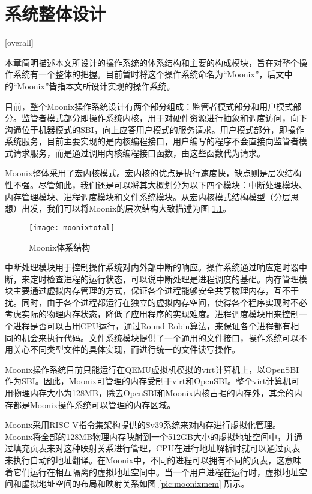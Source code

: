 
\chapter{系统整体设计}[overall]
\label{chapter:overall}

本章简明描述本文所设计的操作系统的体系结构和主要的构成模块，旨在对整个操作系统有一个整体的把握。目前暂时将这个操作系统命名为“Moonix”，后文中的“Moonix”皆指本文所设计实现的操作系统。

目前，整个Moonix操作系统设计有两个部分组成：监管者模式部分和用户模式部分。监管者模式部分即操作系统内核，用于对硬件资源进行抽象和调度访问，向下沟通位于机器模式的SBI，向上应答用户模式的服务请求。用户模式部分，即操作系统服务，目前主要实现的是内核编程接口，用户编写的程序不会直接向监管者模式请求服务，而是通过调用内核编程接口函数，由这些函数代为请求。

Moonix整体采用了宏内核模式。宏内核的优点是执行速度快，缺点则是层次结构性不强。尽管如此，我们还是可以将其大概划分为以下四个模块：中断处理模块、内存管理模块、进程调度模块和文件系统模块。从宏内核模式结构模型（分层思想）出发，我们可以将Moonix的层次结构大致描述为图 \ref{pic:moonixtotal}。

\begin{figure}[htpb]
	\centering
	\texttt{[image: moonixtotal]}
	\setlength{\abovecaptionskip}{2pt}
	\caption{Moonix体系结构}
	\label{pic:moonixtotal}
\end{figure}

中断处理模块用于控制操作系统对内外部中断的响应。操作系统通过响应定时器中断，来定时检查进程的运行状态，可以说中断处理是进程调度的基础。内存管理模块主要通过虚拟内存管理的方式，保证各个进程能够安全共享物理内存，互不干扰。同时，由于各个进程都运行在独立的虚拟内存空间，使得各个程序实现时不必考虑实际的物理内存状态，降低了应用程序的实现难度。进程调度模块用来控制一个进程是否可以占用CPU运行，通过Round-Robin算法\cite{DBLP:journals/eor/RasmussenT08}，来保证各个进程都有相同的机会来执行代码。文件系统模块提供了一个通用的文件接口，操作系统可以不用关心不同类型文件的具体实现，而进行统一的文件读写操作。

Moonix操作系统目前只能运行在QEMU虚拟机模拟的virt计算机上\cite{qemu/virt}，以OpenSBI作为SBI。因此，Moonix可管理的内存受制于virt和OpenSBI。整个virt计算机可用物理内存大小为128MB，除去OpenSBI和Moonix内核占据的内存外，其余的内存都是Moonix操作系统可以管理的内存区域。

Moonix采用RISC-V指令集架构提供的Sv39系统来对内存进行虚拟化管理。Moonix将全部的128MB物理内存映射到一个512GB大小的虚拟地址空间中，并通过填充页表来对这种映射关系进行管理，CPU在进行地址解析时就可以通过页表来执行自动的地址翻译。在Moonix中，不同的进程可以拥有不同的页表，这意味着它们运行在相互隔离的虚拟地址空间中。当一个用户进程在运行时，虚拟地址空间和虚拟地址空间的布局和映射关系如图 \ref{pic:moonixmem} 所示。

